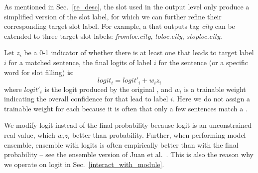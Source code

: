 
As mentioned in Sec.~\ref{re_desc}, the slot \REs used in the output level only produce a simplified version of the slot label, for which
we can further
refine their corresponding target slot label.
For example, a \RE that outputs tag \emph{city} can be extended to three target slot labels: \emph{fromloc.city}, \emph{toloc.city},
\emph{stoploc.city}.

Let $z_i$ be a 0-1 indicator of whether there is at least one \RE that leads to target label $i$ for a matched sentence, the final logits
of label $i$ for the sentence (or a specific word for slot filling) is:
\begin{equation}
logit_i = logit'_i + w_i z_i
\end{equation}
where $logit'_i$ is the logit produced by the original \NN, and $w_i$ is a trainable weight indicating the overall confidence for \REs that
lead to label $i$. Here we do not assign a trainable weight for each \RE because it is often that only a few sentences match a \RE.

We modify logit instead of the final probability because logit is an unconstrained real value, which  $w_i z_i$ better than probability.
Further, when performing model ensemble,
ensemble with logits is often empirically better than with the final probability -- see the ensemble version of Juan et al.~. This is also the reason why we operate on logit %
in Sec.~\ref{interact_with_module}.
